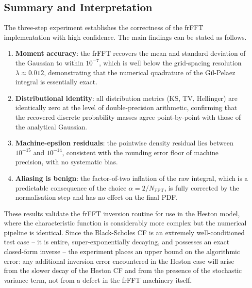 \subsection{Summary and Interpretation}
\label{subsec:validation_summary}

The three-step experiment establishes the correctness of the frFFT
implementation with high confidence.  The main findings can be stated as
follows.

\begin{enumerate}
    \item \textbf{Moment accuracy}: the frFFT recovers the mean and standard
    deviation of the Gaussian to within $10^{-7}$, which is well below the
    grid-spacing resolution $\lambda \approx 0.012$, demonstrating that the
    numerical quadrature of the Gil-Pelaez integral is essentially exact.

    \item \textbf{Distributional identity}: all distribution metrics (KS, TV,
    Hellinger) are identically zero at the level of double-precision
    arithmetic, confirming that the recovered discrete probability masses
    agree point-by-point with those of the analytical Gaussian.

    \item \textbf{Machine-epsilon residuals}: the pointwise density residual
    lies between $10^{-15}$ and $10^{-14}$, consistent with the rounding
    error floor of machine precision, with no systematic bias.

    \item \textbf{Aliasing is benign}: the factor-of-two inflation of the raw
    integral, which is a predictable consequence of the choice
    $\alpha = 2/N_{\mathrm{FFT}}$, is fully corrected by the
    normalisation step and has no effect on the final PDF.
\end{enumerate}

These results validate the frFFT inversion routine for use in the Heston
model, where the characteristic function is considerably more complex but the
numerical pipeline is identical.  Since the Black-Scholes CF is an extremely
well-conditioned test case -- it is entire, super-exponentially decaying, and
possesses an exact closed-form inverse -- the experiment places an upper bound
on the algorithmic error: any additional inversion error encountered in the
Heston case will arise from the slower decay of the Heston CF and from the
presence of the stochastic variance term, not from a defect in the frFFT
machinery itself.





















